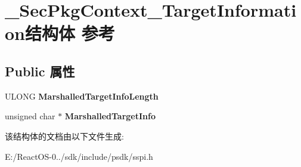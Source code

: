 \hypertarget{struct___sec_pkg_context___target_information}{}\section{\+\_\+\+Sec\+Pkg\+Context\+\_\+\+Target\+Information结构体 参考}
\label{struct___sec_pkg_context___target_information}
\subsection*{Public 属性}
\begin{DoxyCompactItemize}
\item 
\mbox{\label{struct___sec_pkg_context___target_information_aaa27bc082422b68ebe9e816f23548c32}} 
U\+L\+O\+NG {\bfseries Marshalled\+Target\+Info\+Length}
\item 
\mbox{\label{struct___sec_pkg_context___target_information_a0e7f7b8256f018f2ada3e67d7230da25}} 
unsigned char $\ast$ {\bfseries Marshalled\+Target\+Info}
\end{DoxyCompactItemize}


该结构体的文档由以下文件生成\+:\begin{DoxyCompactItemize}
\item 
E\+:/\+React\+O\+S-\/0../sdk/include/psdk/sspi.\+h\end{DoxyCompactItemize}
